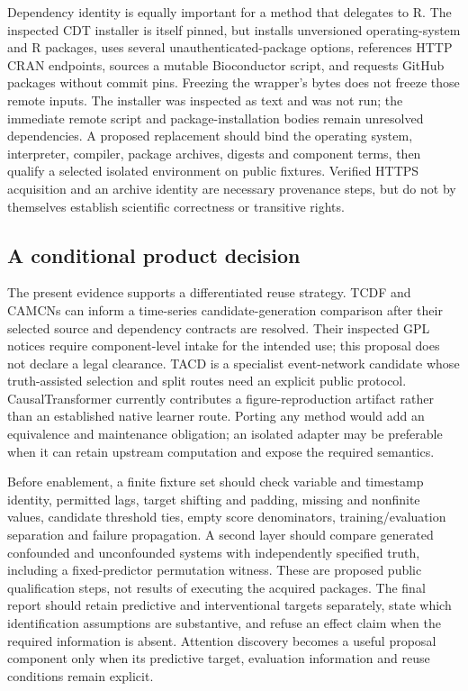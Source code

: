 Dependency identity is equally important for a method that delegates to R. The inspected CDT
installer is itself pinned, but installs unversioned operating-system and R packages, uses
several unauthenticated-package options, references HTTP CRAN endpoints, sources a mutable
Bioconductor script, and requests GitHub packages without commit pins. Freezing the wrapper's
bytes does not freeze those remote inputs. The installer was inspected as text and was not run;
the immediate remote script and package-installation bodies remain unresolved dependencies.
A proposed replacement should bind the operating system, interpreter, compiler, package archives,
digests and component terms, then qualify a selected isolated environment on public fixtures.
Verified HTTPS acquisition and an archive identity are necessary provenance steps, but do not
by themselves establish scientific correctness or transitive rights.~\citep{exec28_at_cdt}

\subsection{A conditional product decision}
The present evidence supports a differentiated reuse strategy. TCDF and CAMCNs can inform a
time-series candidate-generation comparison after their selected source and dependency contracts
are resolved. Their inspected GPL notices require component-level intake for the intended use;
this proposal does not declare a legal clearance. TACD is a specialist event-network candidate
whose truth-assisted selection and split routes need an explicit public protocol. CausalTransformer
currently contributes a figure-reproduction artifact rather than an established native learner
route. Porting any method would add an equivalence and maintenance obligation; an isolated adapter
may be preferable when it can retain upstream computation and expose the required semantics.
\citep{exec28_at_tcdf,exec28_at_camcns,exec28_at_tacd,exec28_at_ct}

Before enablement, a finite fixture set should check variable and timestamp identity, permitted
lags, target shifting and padding, missing and nonfinite values, candidate threshold ties,
empty score denominators, training/evaluation separation and failure propagation. A second layer
should compare generated confounded and unconfounded systems with independently specified truth,
including a fixed-predictor permutation witness. These are proposed public qualification steps,
not results of executing the acquired packages. The final report should retain predictive and
interventional targets separately, state which identification assumptions are substantive, and
refuse an effect claim when the required information is absent.
Attention discovery becomes a useful proposal component only when its predictive target, evaluation information and reuse conditions remain explicit.
